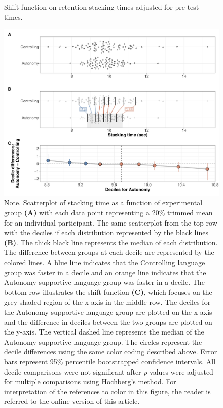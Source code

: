 \documentclass[doc,floatsintext,donotrepeattitle,letterpaper,12pt]{apa7}
\begin{document}
\begin{figure}[htbp]
    \caption{Shift function on retention stacking times adjusted for pre-test times.}
    \centering
    \includegraphics[scale=0.55]{../../figs/fig1.pdf}
    \setlength{\belowcaptionskip}{-2em}
    \caption*{\singlespacing \small Note. \normalfont Scatterplot of stacking time as a function of experimental group \textbf{(A)} with each data point representing a 20\% trimmed mean for an individual participant. The same scatterplot from the top row with the deciles if each distribution represented by the black lines \textbf{(B)}. The thick black line represents the median of each distribution. The difference between groups at each decile are represented by the colored lines. A blue line indicates that the Controlling language group was faster in a decile and an orange line indicates that the Autonomy-supportive language group was faster in a decile. The bottom row illustrates the shift function \textbf{(C)}, which focuses on the grey shaded region of the x-axis in the middle row. The deciles for the Autonomy-supportive language group are plotted on the x-axis and the difference in deciles between the two groups are plotted on the y-axis. The vertical dashed line represents the median of the Autonomy-supportive language group. The circles represent the decile differences using the same color coding described above. Error bars represent 95\% percentile bootstrapped confidence intervals. All decile comparisons were not significant after \emph{p}-values were adjusted for multiple comparisons using Hochberg's method. For interpretation of the references to color in this figure, the reader is referred to the online version of this article.}
    \label{fig:fig1}
\end{figure}
\end{document}
